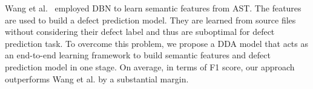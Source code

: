 
Wang et al.~\cite{wang2016automatically} employed DBN to learn semantic features from AST. The features are used to build a defect prediction model. They are learned from source files without considering their defect label and thus are suboptimal for defect prediction task. To overcome this problem, we propose a DDA model that acts as an end-to-end learning framework to build semantic features and defect prediction model in one stage. On average, in terms of F1 score, our approach outperforms Wang et al. by a substantial margin.



